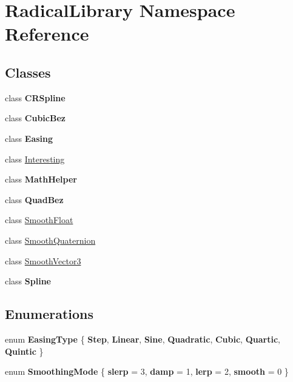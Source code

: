 \hypertarget{namespace_radical_library}{}\section{Radical\+Library Namespace Reference}
\label{namespace_radical_library}
\subsection*{Classes}
\begin{DoxyCompactItemize}
\item 
class {\bfseries C\+R\+Spline}
\item 
class {\bfseries Cubic\+Bez}
\item 
class {\bfseries Easing}
\item 
class \hyperlink{class_radical_library_1_1_interesting}{Interesting}
\item 
class {\bfseries Math\+Helper}
\item 
class {\bfseries Quad\+Bez}
\item 
class \hyperlink{class_radical_library_1_1_smooth_float}{Smooth\+Float}
\item 
class \hyperlink{class_radical_library_1_1_smooth_quaternion}{Smooth\+Quaternion}
\item 
class \hyperlink{class_radical_library_1_1_smooth_vector3}{Smooth\+Vector3}
\item 
class {\bfseries Spline}
\end{DoxyCompactItemize}
\subsection*{Enumerations}
\begin{DoxyCompactItemize}
\item 
\mbox{\label{namespace_radical_library_a2d6877adaf2ec492cf30c572aa684e6f}} 
enum {\bfseries Easing\+Type} \{ \newline
{\bfseries Step}, 
{\bfseries Linear}, 
{\bfseries Sine}, 
{\bfseries Quadratic}, 
\newline
{\bfseries Cubic}, 
{\bfseries Quartic}, 
{\bfseries Quintic}
 \}
\item 
\mbox{\label{namespace_radical_library_a53ca8c4ff40f917ad8d03bb2c0dbd548}} 
enum {\bfseries Smoothing\+Mode} \{ {\bfseries slerp} = 3, 
{\bfseries damp} = 1, 
{\bfseries lerp} = 2, 
{\bfseries smooth} = 0
 \}
\end{DoxyCompactItemize}
